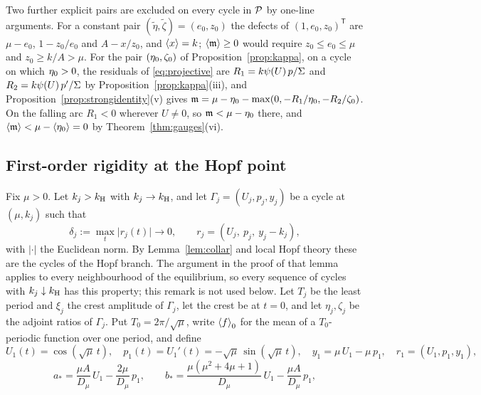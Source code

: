 Two further explicit pairs are excluded on every cycle in $\mathcal P$ by one-line arguments. For a constant pair $(\tilde\eta,\tilde\zeta)=(e_0,z_0)$ the defects of $(1,e_0,z_0)^{\mathsf T}$ are $\mu-e_0$, $1-z_0/e_0$ and $A-x/z_0$, and $\left\langle x\right\rangle=k$; $\left\langle \mathfrak m\right\rangle\ge0$ would require $z_0\le e_0\le\mu$ and $z_0\ge k/A>\mu$. For the pair $(\eta_0,\zeta_0)$ of Proposition~\ref{prop:kappa}, on a cycle on which $\eta_0>0$, the residuals of \eqref{eq:projective} are $R_1=k\psi(U)\,p/\Sigma$ and $R_2=k\psi(U)\,p'/\Sigma$ by Proposition~\ref{prop:kappa}(iii), and Proposition~\ref{prop:strongidentity}(v) gives $\mathfrak m=\mu-\eta_0-\max(0,-R_1/\eta_0,-R_2/\zeta_0)$. On the falling arc $R_1<0$ wherever $U\ne0$, so $\mathfrak m<\mu-\eta_0$ there, and $\left\langle \mathfrak m\right\rangle<\mu-\left\langle \eta_0\right\rangle=0$ by Theorem~\ref{thm:gauges}(vi).

\subsection{First-order rigidity at the Hopf point}\label{neg:sec:rigidity}
Fix $\mu>0$. Let $k_j>k_{\mathrm H}$ with $k_j\to k_{\mathrm H}$, and let $\Gamma_j=(U_j,p_j,y_j)$ be a cycle at $(\mu,k_j)$ such that
\[
\delta_j:=\max_t\bigl|r_j(t)\bigr|\to0,\qquad r_j=(U_j,\ p_j,\ y_j-k_j),
\]
with $|\cdot|$ the Euclidean norm. By Lemma~\ref{lem:collar} and local Hopf theory these are the cycles of the Hopf branch. The argument in the proof of that lemma applies to every neighbourhood of the equilibrium, so every sequence of cycles with $k_j\downarrow k_{\mathrm H}$ has this property; this remark is not used below. Let $T_j$ be the least period and $\xi_j$ the crest amplitude of $\Gamma_j$, let the crest be at $t=0$, and let $\eta_j,\zeta_j$ be the adjoint ratios of $\Gamma_j$. Put $T_0=2\pi/\sqrt\mu$, write $\left\langle f\right\rangle_0$ for the mean of a $T_0$-periodic function over one period, and define
\begin{equation}\label{neg:eq:firstorder}
U_1(t)=\cos(\sqrt\mu\,t),\quad p_1(t)=U_1'(t)=-\sqrt\mu\,\sin(\sqrt\mu\,t),\quad y_1=\mu\,U_1-\mu\,p_1,\quad r_1=(U_1,p_1,y_1),
\end{equation}
\begin{equation}\label{neg:eq:astar}
a_*=\frac{\mu A}{D_\mu}\,U_1-\frac{2\mu}{D_\mu}\,p_1,\qquad
b_*=\frac{\mu(\mu^2+4\mu+1)}{D_\mu}\,U_1-\frac{\mu A}{D_\mu}\,p_1 ,
\end{equation}
